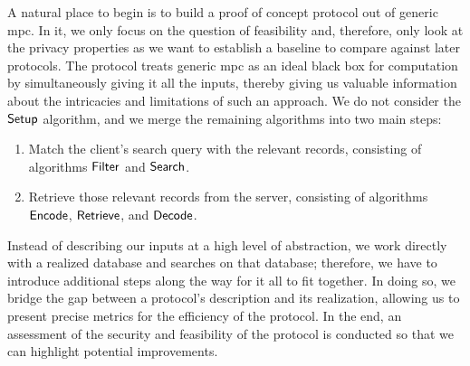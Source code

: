 A natural place to begin is to build a proof of concept protocol out of generic \acrshort{mpc}. In it, we only focus on the question of feasibility and, therefore, only look at the privacy properties as we want to establish a baseline to compare against later protocols. The protocol treats generic \acrshort{mpc} as an ideal black box for computation by simultaneously giving it all the inputs, thereby giving us valuable information about the intricacies and limitations of such an approach. We do not consider the $ \mathsf{{Setup}} $ algorithm, and we merge the remaining algorithms into two main steps: 

\begin{enumerate}
    \item Match the client's search query with the relevant records, consisting of algorithms $ \mathsf{{Filter}} $ and $ \mathsf{{Search}} $.
    \item Retrieve those relevant records from the server, consisting of algorithms $ \mathsf{{Encode}} $, $ \mathsf{{Retrieve}} $, and $ \mathsf{{Decode}} $.
\end{enumerate}
 
Instead of describing our inputs at a high level of abstraction, we work directly with a realized database and searches on that database; therefore, we have to introduce additional steps along the way for it all to fit together. In doing so, we bridge the gap between a protocol's description and its realization, allowing us to present precise metrics for the efficiency of the protocol. In the end, an assessment of the security and feasibility of the protocol is conducted so that we can highlight potential improvements.
